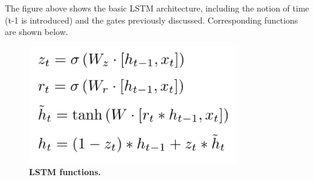 \documentclass[11pt,a4paper]{article}
\begin{document}
The figure above shows the basic LSTM architecture, including the notion of time (t-1 is introduced) and the gates previously discussed. Corresponding functions are shown below.
\begin{figure}[H]
	\centering\includegraphics[scale=0.5]{lstm_functions} 
	\caption{\textbf{ LSTM functions.}}
\end{figure}
\end{document}
